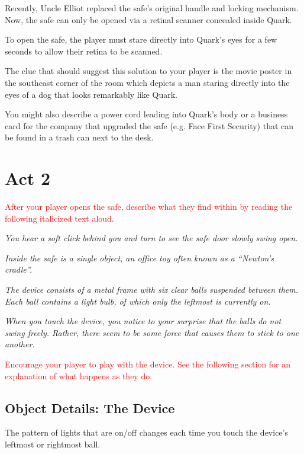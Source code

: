 \documentclass[a6paper, parskip=half, DIV=14, 12pt]{scrartcl}
\begin{document}
Recently, Uncle Elliot replaced the safe's original handle and locking mechanism.
Now, the safe can only be opened via a retinal scanner concealed inside Quark.

To open the safe, the player must stare directly into Quark's eyes for a few seconds to allow their retina to be scanned.

The clue that should suggest this solution to your player is the movie poster in the southeast corner of the room which depicts a man staring directly into the eyes of a dog that looks remarkably like Quark.

You might also describe a power cord leading into Quark's body or a business card for the company that upgraded the safe (e.g. Face First Security) that can be found in a trash can next to the desk. 

\newpage

\section*{Act 2}
\textcolor{Red}{After your player opens the safe, describe what they find within by reading the following italicized text aloud.}

\textit{You hear a soft click behind you and turn to see the safe door slowly swing open.}

\textit{Inside the safe is a single object, an office toy often known as a ``Newton's cradle''.}

\textit{The device consists of a metal frame with six clear balls suspended between them. Each ball contains a light bulb, of which only the leftmost is currently on.}

\textit{When you touch the device, you notice to your surprise that the balls do not swing freely. Rather, there seem to be some force that causes them to stick to one another.}

\textcolor{Red}{Encourage your player to play with the device. See the following section for an explanation of what happens as they do.}

\newpage

\subsection*{Object Details: The Device}
The pattern of lights that are on/off changes each time you touch the device's leftmost or rightmost ball. 
\end{document}
